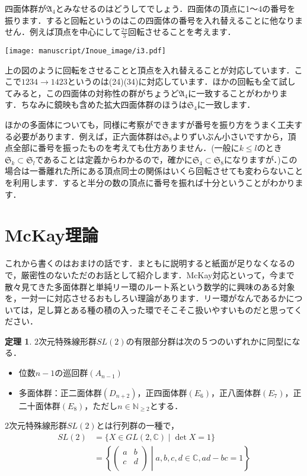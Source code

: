 \documentclass[/main]{subfiles} %
\theoremstyle{definition} %
\newtheorem{ithm}[idefi]{定理}
\begin{document}
四面体群が$\mathfrak{A}_4$とみなせるのはどうしてでしょう．四面体の頂点に1～4の番号を振ります．すると回転というのはこの四面体の番号を入れ替えることに他なりません．例えば頂点を中心にして$\frac{2\pi}{3}$回転させることを考えます．

\texttt{[image: manuscript/Inoue\_image/i3.pdf]}

上の図のように回転をさせることと頂点を入れ替えることが対応しています．ここで$1234\rightarrow1423$というのは(24)(34)に対応しています．ほかの回転も全て試してみると，この四面体の対称性の群がちょうど$\mathfrak{A}_4$に一致することがわかります．ちなみに鏡映も含めた拡大四面体群のほうは$\mathfrak{S}_4$に一致します．

ほかの多面体についても，同様に考察ができますが番号を振り方をうまく工夫する必要があります．例えば，正六面体群は$\mathfrak{S}_8$よりずいぶん小さいですから，頂点全部に番号を振ったものを考えても仕方ありません．(一般に$k\leq l$のとき$\mathfrak{S}_k \subset \mathfrak{S}_l$であることは定義からわかるので，確かに$\mathfrak{S}_4 \subset \mathfrak{S}_8$になりますが．)この場合は一番離れた所にある頂点同士の関係はいくら回転させても変わらないことを利用します．すると半分の数の頂点に番号を振れば十分ということがわかります．

\section{McKay理論}%
これから書くのはおまけの話です．まともに説明すると紙面が足りなくなるので，厳密性のないただのお話として紹介します．McKay対応といって，今まで散々見てきた多面体群と単純リー環のルート系という数学的に興味のある対象を，一対一に対応させるおもしろい理論があります．リー環がなんであるかについては，足し算とある種の積の入った環でそこそこ扱いやすいものだと思ってください．

\begin{ithm}
  $2$次元特殊線形群$SL(2)$の有限部分群は次の５つのいずれかに同型になる．
  \begin{itemize}
  \item 位数$n-1$の巡回群$(A_{n-1})$ %
  \item 多面体群：正二面体群$(D_{n+2})$，正四面体群$(E_6)$，正八面体群$(E_7)$，正二十面体群$(E_8)$，ただし$n \in\mathbb{N}_{ \geq 2}$とする．
  \end{itemize}
\end{ithm}
$2$次元特殊線形群$SL(2)$とは行列群の一種で，
\begin{align*}
  SL(2)&=\{X\in GL(2,\mathbb{C}) \mid \det X=1\}\\
       &=\left\{
           \begin{pmatrix} 
             a&b\\ 
             c&d\\ 
           \end{pmatrix}
  \middle| a,b,c,d \in \mathbb{C} ,ad-bc=1\right\} %
\end{align*} %
\end{document}
